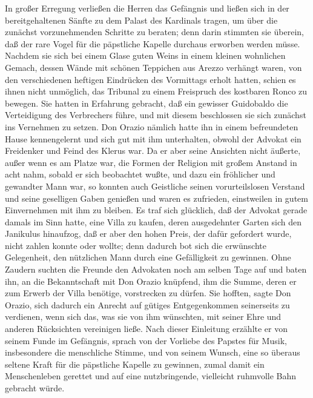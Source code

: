 In großer Erregung verließen die Herren das Gefängnis und ließen
sich in der bereitgehaltenen Sänfte zu dem Palast des Kardinals
tragen, um über die zunächst vorzunehmenden Schritte zu beraten;
denn darin stimmten sie überein, daß der rare Vogel für die
päpstliche Kapelle durchaus erworben werden müsse. Nachdem sie sich
bei einem Glase guten Weins in einem kleinen wohnlichen Gemach,
dessen Wände mit schönen Teppichen aus Arezzo verhängt waren, von
den verschiedenen heftigen Eindrücken des Vormittags erholt hatten,
schien es ihnen nicht unmöglich, das Tribunal zu einem Freispruch
des kostbaren Ronco zu bewegen. Sie hatten in Erfahrung gebracht,
daß ein gewisser Guidobaldo die Verteidigung des Verbrechers führe,
und mit diesem beschlossen sie sich zunächst ins Vernehmen zu
setzen. Don Orazio nämlich hatte ihn in einem befreundeten Hause
kennengelernt und sich gut mit ihm unterhalten, obwohl der Advokat
ein Freidenker und Feind des Klerus war. Da er aber seine Ansichten
nicht äußerte, außer wenn es am Platze war, die Formen der Religion
mit großem Anstand in acht nahm, sobald er sich beobachtet wußte,
und dazu ein fröhlicher und gewandter Mann war, so konnten auch
Geistliche seinen vorurteilslosen Verstand und seine geselligen
Gaben genießen und waren es zufrieden, einstweilen in gutem
Einvernehmen mit ihm zu bleiben. Es traf sich glücklich, daß der
Advokat gerade damals im Sinn hatte, eine Villa zu kaufen, deren
ausgedehnter Garten sich den Janikulus hinaufzog, daß er aber den
hohen Preis, der dafür gefordert wurde, nicht zahlen konnte oder
wollte; denn dadurch bot sich die erwünschte Gelegenheit, den
nützlichen Mann durch eine\pagenum{[72]} Gefälligkeit zu gewinnen.
Ohne Zaudern suchten die Freunde den Advokaten noch am selben Tage
auf und baten ihn, an die Bekanntschaft mit Don Orazio knüpfend,
ihm die Summe, deren er zum Erwerb der Villa benötige, vorstrecken
zu dürfen. Sie hofften, sagte Don Orazio, sich dadurch ein Anrecht
auf gütiges Entgegenkommen seinerseits zu verdienen, wenn sich das,
was sie von ihm wünschten, mit seiner Ehre und anderen Rücksichten
vereinigen ließe. Nach dieser Einleitung erzählte er von seinem
Funde im Gefängnis, sprach von der Vorliebe des Papstes für Musik,
insbesondere die menschliche Stimme, und von seinem Wunsch, eine so
überaus seltene Kraft für die päpstliche Kapelle zu gewinnen, zumal
damit ein Menschenleben gerettet und auf eine nutzbringende,
vielleicht ruhmvolle Bahn gebracht würde.

